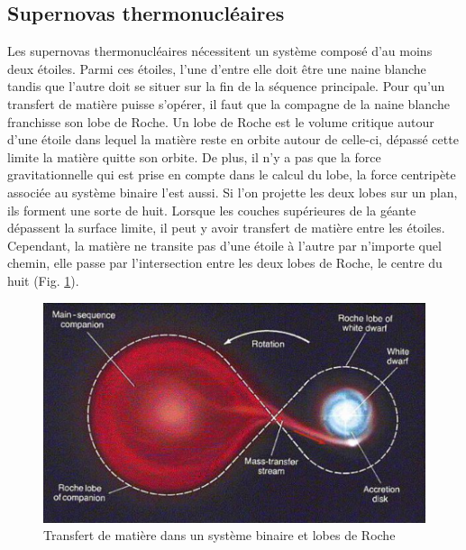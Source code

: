 \vfill
{}

\subsection{Supernovas thermonucléaires}\label{3.1.2} 

Les supernovas thermonucléaires nécessitent un système composé d'au moins deux étoiles. Parmi ces étoiles, l'une d'entre elle doit être une naine blanche tandis que l'autre doit se situer sur la fin de la séquence principale. Pour qu'un transfert de matière puisse s'opérer, il faut que la compagne de la naine blanche franchisse son lobe de Roche. Un lobe de Roche est le volume critique autour d'une étoile dans lequel la matière reste en orbite autour de celle-ci, dépassé cette limite la matière quitte son orbite. De plus, il n'y a pas que la force gravitationnelle qui est prise en compte dans le calcul du lobe, la force centripète associée au système binaire l'est aussi. Si l'on projette les deux lobes sur un plan, ils forment une sorte de huit. Lorsque les couches supérieures de la géante dépassent la surface limite, il peut y avoir transfert de matière entre les étoiles. Cependant, la matière ne transite pas d'une étoile à l'autre par n'importe quel chemin, elle passe par l'intersection entre les deux lobes de Roche, le centre du huit (Fig. \ref{Fig. 3.2}).\bigskip

\begin{figure}[H]
	\centering
	\includegraphics[scale=0.6]{images/lobederoche}
	\caption[Transfert de matière dans un système binaire et lobes de Roche\newline]{Transfert de matière dans un système binaire et lobes de Roche}
	\label{Fig. 3.2}
\end{figure}\bigskip 

